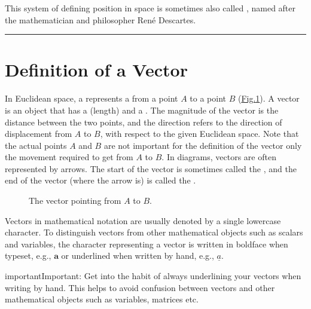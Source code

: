 \documentclass[letterpaper,10pt,english]{jupyterBook}
\let\sphinxpxdimen\pdfpxdimen\else\newdimen\sphinxpxdimen
\begin{document}
\sphinxAtStartPar
This system of defining position in space is sometimes also called , named after the mathematician and philosopher René Descartes.


\bigskip\hrule\bigskip



\section{Definition of a Vector}
\label{\detokenize{_pages/3.0_Vectors:definition-of-a-vector}}\label{\detokenize{_pages/3.0_Vectors:vectors-definition-section}}
\sphinxAtStartPar
In Euclidean space, a  represents a  from a point \(A\) to a point \(B\) (\hyperref[\detokenize{_pages/3.0_Vectors:vector-figure}]{Fig.\@ \ref{\detokenize{_pages/3.0_Vectors:vector-figure}}}). A vector is an object that has a  (length) and a . The magnitude of the vector is the distance between the two points, and the direction refers to the direction of displacement from \(A\) to \(B\), with respect to the given Euclidean space. Note that the actual points \(A\) and \(B\) are not important for the definition of the vector \sphinxhyphen{} only the movement required to get from \(A\) to \(B\). In diagrams, vectors are  often represented by arrows. The start of the vector is sometimes called the , and the end of the vector (where the arrow is) is called the .

\begin{figure}[htbp]
\centering
\capstart

\noindent\sphinxincludegraphics[width=250\sphinxpxdimen]{{3_vector}.svg}
\caption{The vector pointing from \(A\) to \(B\).}\label{\detokenize{_pages/3.0_Vectors:vector-figure}}\end{figure}

\sphinxAtStartPar
Vectors in mathematical notation are usually denoted by a single lowercase character. To distinguish vectors from other mathematical objects such as scalars and variables, the character representing a vector is written in boldface when typeset, e.g., \(\mathbf{a}\) or underlined when written by hand, e.g., \(\underline{a}\).

\begin{sphinxadmonition}{important}{Important:}
\sphinxAtStartPar
Get into the habit of always underlining your vectors when writing by hand. This helps to avoid confusion between vectors and other mathematical objects such as variables, matrices etc.
\end{sphinxadmonition}
\end{document}
